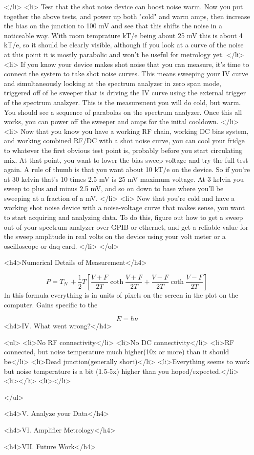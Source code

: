 \documentclass[11pt]{article}
\begin{document}
    </li>
    <li>
        Test that the shot noise device can boost noise warm.  Now you put together the above tests, and power up both "cold" and warm amps, then increase the bias on the junction to 100 mV and see that this shifts the noise in a noticeable way.  With room temprature kT/e being about 25 mV this is about 4 kT/e, so it should be clearly visible, although if you look at a curve of the noise at this point it is mostly parabolic and won't be useful for metrology yet. 
    </li>
    <li>
        If you know your device makes shot noise that you can measure, it's time to connect the system to take shot noise curves.  This means sweeping your IV curve and simultaneously looking at the spectrum analyzer in zero span mode, triggered off of he sweeper that is driving the IV curve using the external trigger of the spectrum analzyer.  This is the measurement you will do cold, but warm.  You should see a sequence of parabolas on the spectrum analyzer.  Once this all works, you can power off the sweeper and amps for the inital cooldown.
    </li>
    <li>
        Now that you know you have a working RF chain, working DC bias system, and working combined RF/DC with a shot noise curve, you can cool your fridge to whatever the first obvious test point is, probably before you start circulating mix.  At that point, you want to lower the bias sweep voltage and try the full test again.  A rule of thumb is that you want about 10 kT/e on the device.  So if you're at 30 kelvin that's 10 times 2.5 mV is 25 mV maximum voltage.  At 3 kelvin you sweep to plus and minus 2.5 mV, and so on down to base where you'll be sweeping at a fraction of a mV.  
    </li>
    <li>
        Now that you're cold and have a working shot noise device with a noise-voltage curve that makes sense, you want to start acquiring and analyzing data.  To do this, figure out how to get a sweep out of your spectrum analyzer over GPIB or ethernet, and get a reliable value for the sweep amplitude in real volts on the device using your volt meter or a oscilloscope or daq card.
    </li>
</ol>

<h4>Numerical Details of Measurement</h4>

$$
P = T_N \ + \frac{1}{2}T\left[\frac{V+F}{2T}\coth{\frac{V+F}{2T}}
+ \frac{V-F}{2T}\coth{\frac{V-F}{2T}}\right]
$$
In this formula everything is in units of pixels on the screen in the plot on the computer.  Gains specific to the 

$$
E = h\nu
$$
<h4>IV. What went wrong?</h4>

<ul>
<li>No RF connectivity</li>
<li>No DC connectivity</li>
<li>RF connected, but noise temperature much higher(10x or more) than it should be</li>
<li>Dead junction(generally short)</li>
<li>Everything seems to work but noise temperature is a bit (1.5-5x) higher than you hoped/expected.</li>
<li></li>
<li></li>

</ul>

<h4>V. Analyze your Data</h4>

<h4>VI. Amplifier Metrology</h4>

<h4>VII. Future Work</h4>
\end{document}
